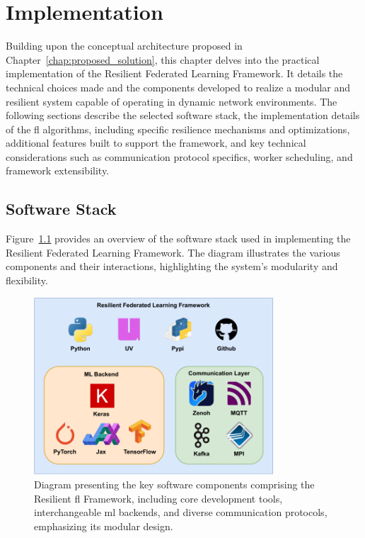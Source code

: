 \chapter{Implementation}
\label{chap:implementation}

\begin{introduction}

Building upon the conceptual architecture proposed in Chapter~\ref{chap:proposed_solution}, this chapter delves into the practical implementation of the Resilient Federated Learning Framework. It details the technical choices made and the components developed to realize a modular and resilient system capable of operating in dynamic network environments. The following sections describe the selected software stack, the implementation details of the \ac{fl} algorithms, including specific resilience mechanisms and optimizations, additional features built to support the framework, and key technical considerations such as communication protocol specifics, worker scheduling, and framework extensibility.

\end{introduction}


\section{Software Stack}
\label{sec:technology-stack}

Figure~\ref{fig:technology-stack} provides an overview of the software stack used in implementing the Resilient Federated Learning Framework. The diagram illustrates the various components and their interactions, highlighting the system's modularity and flexibility.

\begin{figure}[!htbp]
    \centering
    \includegraphics[width=0.8\textwidth]{figs/technology-stack.pdf}
    \caption[Software Stack of the Resilient FL Framework]{Diagram presenting the key software components comprising the Resilient \ac{fl} Framework, including core development tools, interchangeable \ac{ml} backends, and diverse communication protocols, emphasizing its modular design.}
    \label{fig:technology-stack}
\end{figure}

